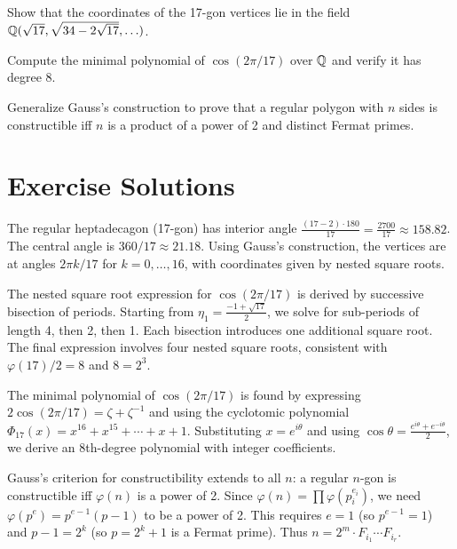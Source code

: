 \begin{exercise}
Show that the coordinates of the 17-gon vertices lie in the field $\mathbb{Q}(\sqrt{17}, \sqrt{34-2\sqrt{17}}, \ldots)$.
\end{exercise}

\begin{exercise}
Compute the minimal polynomial of $\cos(2\pi/17)$ over $\mathbb{Q}$ and verify it has degree 8.
\end{exercise}

\begin{exercise}
Generalize Gauss's construction to prove that a regular polygon with $n$ sides is constructible iff $n$ is a product of a power of 2 and distinct Fermat primes.
\end{exercise}



\section{Exercise Solutions}

\begin{solution}
The regular heptadecagon (17-gon) has interior angle $\frac{(17-2) \cdot 180}{17} = \frac{2700}{17} \approx 158.82$. The central angle is $360/17 \approx 21.18$. Using Gauss's construction, the vertices are at angles $2\pi k/17$ for $k = 0, \ldots, 16$, with coordinates given by nested square roots.
\end{solution}

\begin{solution}
The nested square root expression for $\cos(2\pi/17)$ is derived by successive bisection of periods. Starting from $\eta_1 = \frac{-1+\sqrt{17}}{2}$, we solve for sub-periods of length 4, then 2, then 1. Each bisection introduces one additional square root. The final expression involves four nested square roots, consistent with $\varphi(17)/2 = 8$ and $8 = 2^3$.
\end{solution}

\begin{solution}
The minimal polynomial of $\cos(2\pi/17)$ is found by expressing $2\cos(2\pi/17) = \zeta + \zeta^{-1}$ and using the cyclotomic polynomial $\Phi_{17}(x) = x^{16} + x^{15} + \cdots + x + 1$. Substituting $x = e^{i\theta}$ and using $\cos\theta = \frac{e^{i\theta}+e^{-i\theta}}{2}$, we derive an 8th-degree polynomial with integer coefficients.
\end{solution}

\begin{solution}
Gauss's criterion for constructibility extends to all $n$: a regular $n$-gon is constructible iff $\varphi(n)$ is a power of 2. Since $\varphi(n) = \prod \varphi(p_i^{e_i})$, we need $\varphi(p^e) = p^{e-1}(p-1)$ to be a power of 2. This requires $e = 1$ (so $p^{e-1}=1$) and $p-1 = 2^k$ (so $p = 2^k+1$ is a Fermat prime). Thus $n = 2^m \cdot F_{i_1} \cdots F_{i_r}$.
\end{solution}


